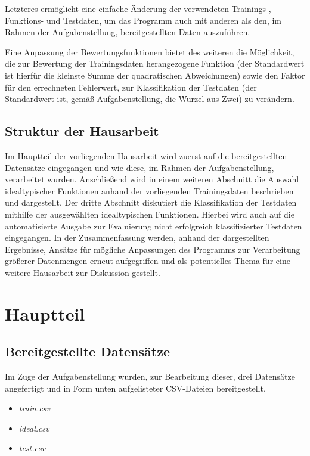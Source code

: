 Letzteres ermöglicht eine einfache Änderung der verwendeten Trainings-, Funktions- und Testdaten, um das Programm auch mit anderen als den, im Rahmen der Aufgabenstellung, bereitgestellten Daten auszuführen.

Eine Anpassung der Bewertungsfunktionen bietet des weiteren die Möglichkeit, die zur Bewertung der Trainingsdaten herangezogene Funktion (der Standardwert ist hierfür die kleinste Summe der quadratischen Abweichungen) sowie den Faktor für den errechneten Fehlerwert, zur Klassifikation der Testdaten (der Standardwert ist, gemäß Aufgabenstellung, die Wurzel aus Zwei) zu verändern.

\section{Struktur der Hausarbeit}

Im Hauptteil der vorliegenden Hausarbeit wird zuerst auf die bereitgestellten Datensätze eingegangen und wie diese, im Rahmen der Aufgabenstellung, verarbeitet wurden.
Anschließend wird in einem weiteren Abschnitt die Auswahl idealtypischer Funktionen anhand der vorliegenden Trainingsdaten beschrieben und dargestellt.
Der dritte Abschnitt diskutiert die Klassifikation der Testdaten mithilfe der ausgewählten idealtypischen Funktionen. Hierbei wird auch auf die automatisierte Ausgabe zur Evaluierung nicht erfolgreich klassifizierter Testdaten eingegangen.
In der Zusammenfassung werden, anhand der dargestellten Ergebnisse, Ansätze für mögliche Anpassungen des Programms zur Verarbeitung größerer Datenmengen erneut aufgegriffen und als potentielles Thema für eine weitere Hausarbeit zur Diskussion gestellt.

\chapter{Hauptteil}

\section{Bereitgestellte Datensätze}

Im Zuge der Aufgabenstellung wurden, zur Bearbeitung dieser, drei Datensätze angefertigt und in Form unten aufgelisteter CSV-Dateien bereitgestellt.

\begin{itemize}
 \itemsep0pt
 \item \emph{train.csv}
 \item \emph{ideal.csv}
 \item \emph{test.csv}
\end{itemize}


